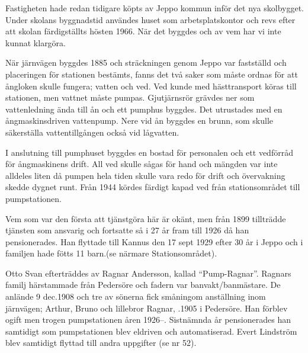Fastigheten hade redan tidigare köpts av Jeppo kommun inför det nya skolbygget. Under skolans byggnadstid användes huset som arbetsplatskontor och revs efter att skolan färdigställts hösten 1966. När det byggdes och av vem har vi inte kunnat klargöra.



%

%
När järnvägen byggdes 1885 och sträckningen genom Jeppo var fastställd och placeringen för stationen bestämts, fanns det två saker som måste ordnas för att ångloken skulle fungera; vatten och ved. Ved kunde med hästtransport köras till stationen, men vattnet måste pumpas. Gjutjärnsrör grävdes ner som vattenledning ända till ån och ett pumphus byggdes. Det utrustades med en ångmaskinsdriven vattenpump. Nere vid ån byggdes en brunn, som skulle säkerställa vattentillgången också vid lågvatten.


I anslutning till pumphuset byggdes en bostad för personalen och ett vedförråd för ångmaskinens drift. All ved skulle sågas för hand och mängden var inte alldeles liten då pumpen hela tiden skulle vara redo för drift och övervakning skedde dygnet runt. Från 1944 kördes färdigt kapad ved från stationsområdet till pumpstationen.

Vem som var den första att tjänstgöra här är okänt, men från 1899 tillträdde  tjänsten som ansvarig och fortsatte så i 27 år fram till 1926 då han pensionerades. Han flyttade till Kannus den 17 sept 1929 efter 30 år i Jeppo och i familjen hade fötts 11 barn.(se närmare Stationsområdet).


Otto Svan efterträddes av Ragnar Andersson, kallad ``Pump-Ragnar''. Ragnars familj härstammade från Pedersöre och fadern var banvakt/banmästare. De anlände 9 dec.1908 och tre av sönerna fick småningom anställning inom järnvägen; Arthur, Bruno och lillebror Ragnar, .1905 i Pedersöre. Han förblev ogift men trogen pumpstationen åren 1926--. Sistnämnda år pensionerades han samtidigt som pumpstationen blev eldriven och automatiserad. Evert Lindström blev samtidigt flyttad till andra uppgifter (se nr 52).

